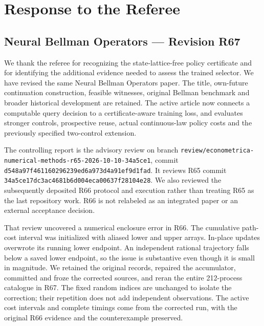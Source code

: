 \hypertarget{response-to-the-referee}{%
\section{Response to the Referee}\label{response-to-the-referee}}

\hypertarget{neural-bellman-operators-revision-r67}{%
\subsection{Neural Bellman Operators --- Revision
R67}\label{neural-bellman-operators-revision-r67}}

We thank the referee for recognizing the state-lattice-free policy
certificate and for identifying the additional evidence needed to assess
the trained selector. We have revised the same Neural Bellman Operators
paper. The title, own-future continuation construction, feasible
witnesses, original Bellman benchmark and broader historical development
are retained. The active article now connects a computable query
decision to a certificate-aware training loss, and evaluates stronger
controls, prospective reuse, actual continuous-law policy costs and the
previously specified two-control extension.

The controlling report is the advisory review on branch
\texttt{review/econometrica-numerical-methods-r65-2026-10-10-34a5ce1},
commit \texttt{d548a97f461160296239ed6a973d4a91ef9d1fad}. It reviews R65
commit \texttt{34a5ce17dc3ac4681b6d004eca00637f28104e28}. We also
reviewed the subsequently deposited R66 protocol and execution rather
than treating R65 as the last repository work. R66 is not relabeled as
an integrated paper or an external acceptance decision.

That review uncovered a numerical enclosure error in R66. The cumulative
path-cost interval was initialized with aliased lower and upper arrays.
In-place updates overwrote its running lower endpoint. An independent
rational trajectory falls below a saved lower endpoint, so the issue is
substantive even though it is small in magnitude. We retained the
original records, repaired the accumulator, committed and froze the
corrected sources, and reran the entire 212-process catalogue in R67.
The fixed random indices are unchanged to isolate the correction; their
repetition does not add independent observations. The active cost
intervals and complete timings come from the corrected run, with the
original R66 evidence and the counterexample preserved.

